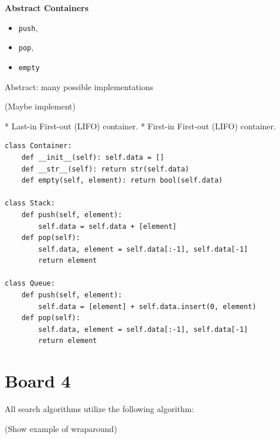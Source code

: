 \documentclass[10pt]{article}
\begin{document}
\textbf{Abstract Containers}

\begin{itemize}
\item \texttt{push}, 
\item \texttt{pop},
\item \texttt{empty}
\end{itemize}

Abstract: many possible implementations

(Maybe implement)

*  Last-in First-out (LIFO) container.  
*  First-in First-out (LIFO) container.  

\begin{lstlisting}
class Container:
    def __init__(self): self.data = []
    def __str__(self): return str(self.data)
    def empty(self, element): return bool(self.data) 

class Stack:
    def push(self, element): 
        self.data = self.data + [element]
    def pop(self): 
        self.data, element = self.data[:-1], self.data[-1]
        return element

class Queue:
    def push(self, element): 
        self.data = [element] + self.data.insert(0, element)
    def pop(self): 
        self.data, element = self.data[:-1], self.data[-1]
        return element
\end{lstlisting}


\section{Board 4}
All search algorithms utilize the following algorithm:

\begin{algorithm}

\begin{algorithmic}[1]
  \State{}
  \EndIf{}
  \State{}

  \State{}
  \State{}
  \EndFor{}
  \EndWhile{}
  \EndProcedure{}
\end{algorithmic}
\end{algorithm}


(Show example of wraparound)
\end{document}
